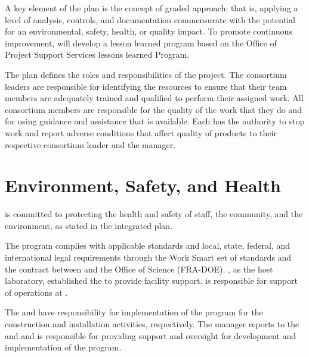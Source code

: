 A key element of the   plan is the
concept of graded approach; that is, applying a level of analysis,
controls, and documentation commensurate with the potential for an
environmental, safety, health, or quality impact. To promote continuous improvement,   will develop a
lesson learned program based on the \fnal Office of Project Support
Services lessons learned Program.


The  plan
defines the  roles and responsibilities of the 
project. The  consortium leaders are responsible for identifying the
resources to ensure that their team members are adequately trained and
qualified to perform their assigned work.
All consortium members are responsible for the quality of the work that
they do and for using guidance and assistance that is available. Each
has the authority to stop work and report adverse conditions that
affect quality of  products to their respective
 consortium leader and the 
 manager.




\section{Environment, Safety, and Health}
\label{sec:es-tc-eshq}

 is committed to protecting the health and safety of
staff, the community, and the environment, as stated in the
 integrated  plan.

The   program complies with applicable
standards and local, state, federal, and international legal
requirements through the  Work Smart set of standards and the
contract between  and the 
Office of Science (FRA-DOE). \fnal, as the host laboratory,
established the  to provide facility support.
 is responsible for support of 
operations at .

The  and  have responsibility for
implementation of the   program for the construction and installation activities, respectively.  The
  manager reports to the
 and  and is responsible for providing
 support and oversight for development and implementation of the 
  program. 

